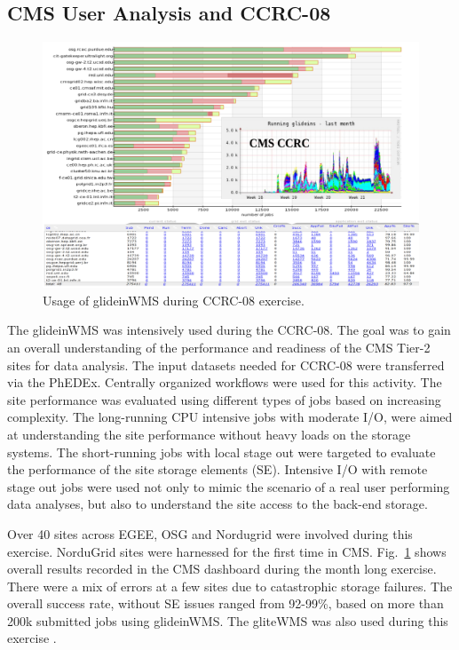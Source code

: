 \documentclass[a4paper]{jpconf}
\begin{document}
\subsection{CMS User Analysis and CCRC-08}
\begin{figure}
\begin{center}
\includegraphics[scale=0.55]{glideins_ccrc08}
\end{center}
\caption{Usage of glideinWMS during CCRC-08 exercise.}
\label{fig:glideins_ccrc}
\end{figure}
The glideinWMS was intensively used during the CCRC-08. The goal was to gain an overall understanding 
of the performance and readiness of the CMS Tier-2 sites for data analysis. The input datasets needed for CCRC-08 were transferred
via the PhEDEx. Centrally organized workflows were used for this activity. The site performance
was evaluated using different types of jobs based on increasing complexity. The long-running 
CPU intensive jobs with moderate I/O, were aimed at understanding the site performance without
heavy loads on the storage systems. The short-running jobs with local stage out were targeted
to evaluate the performance of the site storage elements (SE). Intensive I/O with remote stage out
jobs were used not only to mimic the scenario of a real user performing data analyses, but also
to understand the site access to the back-end storage.

Over 40 sites across EGEE, OSG and Nordugrid were involved during this exercise. NorduGrid sites 
were harnessed for the first time in CMS. Fig.~\ref{fig:glideins_ccrc} shows overall results recorded in the CMS dashboard 
during the month long exercise. There were a mix of errors at a few sites due to catastrophic storage 
failures. The overall success rate, without SE issues ranged from 92-99\%, based on more than 200k 
submitted jobs using glideinWMS. The gliteWMS was also used during this exercise \cite{bib:cms_glite}.
\end{document}
